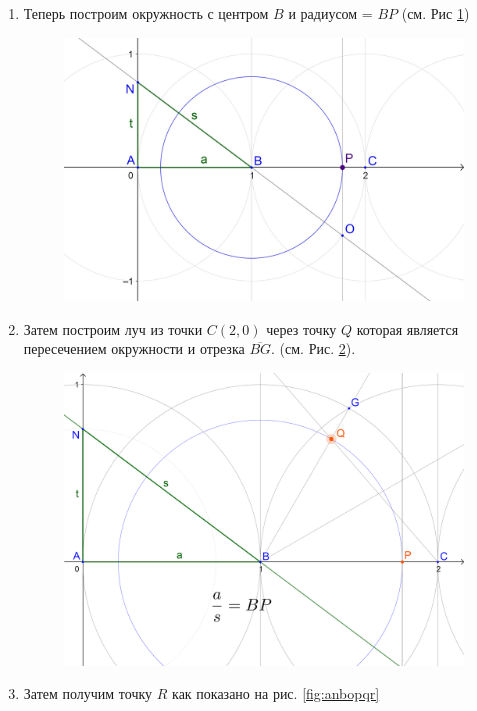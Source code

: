 \documentclass[12pt, letterpaper, oneside]{report}
\begin{document}
\begin{enumerate}
\\
	\item Теперь построим окружность с центром $B$ и радиусом = $BP$ (см. Рис \ref{fig:anbop})\\ 
\begin{figure}[h]
	\centerline{\includegraphics[scale=0.15]{img/anbop.jpg}}
	\caption{}
	\label{fig:anbop}
\end{figure}
\newpage
	\item Затем построим луч из точки $C(2,0)$ через точку $Q$ которая является пересечением окружности и отрезка $\overline{BG}$. (см. Рис. \ref{fig:anbopq}).
\begin{figure}[h]
	\centerline{\includegraphics[scale=0.15]{img/anbopQ.png}}
	\caption{}
	\label{fig:anbopq}
\end{figure}
	\item Затем получим точку $R$ как показано на рис. \ref{fig:anbopqr}\\

\end{enumerate}
\end{document}
